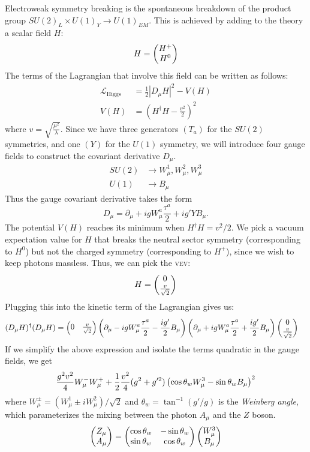Electroweak symmetry breaking is the spontaneous breakdown of the product group $SU(2)_L\times U(1)_Y\rightarrow U(1)_{EM}$. This is achieved by adding to the theory a scalar field $H$:
$$H = \begin{pmatrix} H^+ \\ H^0\end{pmatrix}$$
The terms of the Lagrangian that involve this field can be written as follows:
\begin{align}
  \label{eq:higgs_kinetic}
  \mathcal{L}_{\text{Higgs}} &= \frac{1}{2}\left|D_\mu H\right|^2-V(H)\\
  \label{eq:higgs_potential}
  V(H) &= \left(H^\dag H-\frac{v^2}{2}\right)^2
\end{align}
where $v = \sqrt{\frac{\mu^2}{\lambda}}$. Since we have three generators $(T_a)$ for the $SU(2)$ symmetries, and one $(Y)$ for the $U(1)$ symmetry, we will introduce four gauge fields to construct the covariant derivative $D_\mu$.
\begin{align*}
  SU(2)&\rightarrow W_\mu^1,W_\mu^2, W_\mu^3\\
  U(1)&\rightarrow B_\mu
\end{align*}
Thus the gauge covariant derivative takes the form
$$D_\mu = \partial_\mu + igW_\mu^a\frac{\tau^a}{2}+ig'YB_\mu.$$
The potential $V(H)$ reaches its minimum when $H^\dag H = v^2 / 2$. We pick a vacuum expectation value for $H$ that breaks the neutral sector symmetry (corresponding to $H^0$) but not the charged symmetry (corresponding to $H^{+}$), since we wish to keep photons massless. Thus, we can pick the \textsc{vev}:
$$H = \begin{pmatrix} 0 \\ \frac{v}{\sqrt{2}}\end{pmatrix}$$
Plugging this into the kinetic term of the Lagrangian gives us:
\begin{align*}
  (D_\mu H)^\dag(D_\mu H) &= \begin{pmatrix} 0 & \frac{v}{\sqrt{2}}\end{pmatrix}
  \left(\partial_\mu - igW_\mu^a\frac{\tau^a}{2}
  -\frac{ig'}{2}B_\mu\right)
  \left(\partial_\mu+igW_\mu^a\frac{\tau^a}{2}+\frac{ig'}{2}B_\mu\right)
  \begin{pmatrix} 0 \\ \frac{v}{\sqrt{2}}\end{pmatrix}
\end{align*}
If we simplify the above expression and isolate the terms quadratic in the gauge fields, we get
\[\frac{g^2v^2}{4}W_\mu^-W_\mu^++\frac{1}{2}\frac{v^2}{4}(g^2+g'^2)
\left(\cos\theta_w W_\mu^3 - \sin\theta_w B_\mu\right)^2\]
where $W_\mu^\pm = (W_\mu^1\pm iW_\mu^2)/\sqrt{2}$  and $\theta_w = \tan^{-1}(g'/g)$ is the \emph{Weinberg angle}, which parameterizes the mixing between the photon $A_\mu$ and the $Z$ boson.
\begin{equation}\label{eq:z_a_mixing}
\begin{pmatrix} Z_\mu \\ A_\mu\end{pmatrix} = \begin{pmatrix} \cos\theta_w & -\sin\theta_w \\ \sin\theta_w & \cos\theta_w\end{pmatrix}
\begin{pmatrix} W_{\mu}^{3} \\ B_{\mu}\end{pmatrix}
\end{equation}
